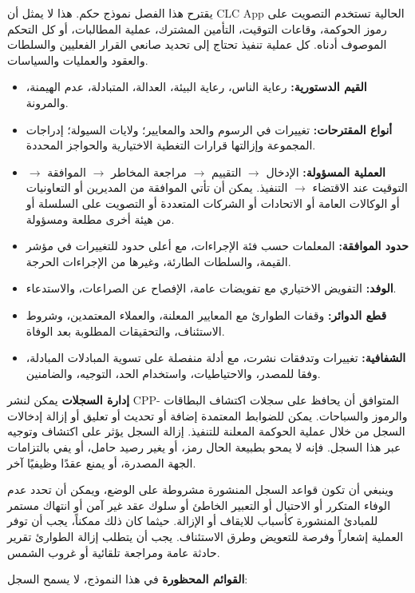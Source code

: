 \documentclass[11pt]{article}
\begin{document}
يقترح هذا الفصل نموذج حكم. هذا لا يمثل أن CLC App الحالية تستخدم التصويت على رموز الحوكمة، وقاعات التوقيت، التأمين المشترك، عملية المطالبات، أو كل التحكم الموصوف أدناه. كل عملية تنفيذ تحتاج إلى تحديد صانعي القرار الفعليين والسلطات والعقود والعمليات والسياسات.

\begin{itemize}[leftmargin=*]
\item \textbf{القيم الدستورية:} رعاية الناس، رعاية البيئة، العدالة، المتبادلة، عدم الهيمنة، والمرونة.
\item \textbf{أنواع المقترحات:} تغييرات في الرسوم والحد والمعايير؛ ولايات السيولة؛ إدراجات المجموعة وإزالتها قرارات التغطية الاختيارية والحواجز المحددة.
\item \textbf{العملية المسؤولة:} الإدخال $\to$ التقييم $\to$ مراجعة المخاطر $\to$ الموافقة $\to$ التوقيت عند الاقتضاء $\to$ التنفيذ. يمكن أن تأتي الموافقة من المديرين أو التعاونيات أو الوكالات العامة أو الاتحادات أو الشركات المتعددة أو التصويت على السلسلة أو من هيئة أخرى مطلعة ومسؤولة.
\item \textbf{حدود الموافقة:} المعلمات حسب فئة الإجراءات، مع أعلى حدود للتغييرات في مؤشر القيمة، والسلطات الطارئة، وغيرها من الإجراءات الحرجة.
\item \textbf{الوفد:} التفويض الاختياري مع تفويضات عامة، الإفصاح عن الصراعات، والاستدعاء.
\item \textbf{قطع الدوائر:} وقفات الطوارئ مع المعايير المعلنة، والعملاء المعتمدين، وشروط الاستئناف، والتحقيقات المطلوبة بعد الوفاة.
\item \textbf{الشفافية:} تغييرات وتدفقات نشرت، مع أدلة منفصلة على تسوية المبادلات المبادلة، وفقا للمصدر، والاحتياطيات، واستخدام الحد، التوجيه، والضامنين.
\end{itemize}
\textbf{إدارة السجلات} يمكن لنشر CPP- المتوافق أن يحافظ على سجلات اكتشاف البطاقات والرموز والسباحات. يمكن للضوابط المعتمدة إضافة أو تحديث أو تعليق أو إزالة إدخالات السجل من خلال عملية الحوكمة المعلنة للتنفيذ. إزالة السجل يؤثر على اكتشاف وتوجيه عبر هذا السجل. فإنه لا يمحو بطبيعة الحال رمز، أو يغير رصيد حامل، أو يفي بالتزامات الجهة المصدرة، أو يمنع عقدًا وظيفيًا آخر.

وينبغي أن تكون قواعد السجل المنشورة مشروطة على الوضع، ويمكن أن تحدد عدم الوفاء المتكرر أو الاحتيال أو التعبير الخاطئ أو سلوك عقد غير آمن أو انتهاك مستمر للمبادئ المنشورة كأسباب للايقاف أو الإزالة. حيثما كان ذلك ممكناً، يجب أن توفر العملية إشعاراً وفرصة للتعويض وطرق الاستئناف. يجب أن يتطلب إزالة الطوارئ تقرير حادثة عامة ومراجعة تلقائية أو غروب الشمس.

\textbf{القوائم المحظورة} في هذا النموذج، لا يسمح السجل:
\end{document}
